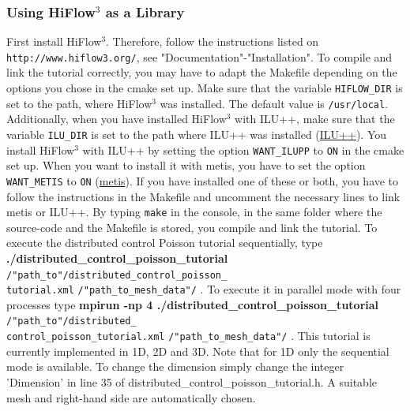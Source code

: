 \documentclass[a4paper, 11pt, twoside]{article}
\begin{document}
\subsubsection{Using HiFlow$^3$ as a Library}\label{sectionlibrary}
First install HiFlow$^3$. Therefore, follow the instructions listed on \verb'http://www.hiflow3.org/', see "Documentation"-"Installation".
To compile and link the tutorial correctly, you may have to adapt the Makefile depending on the options you chose in the cmake set up. Make sure that the variable \verb'HIFLOW_DIR' is set to the path, where HiFlow$^3$ was installed. The default value is \verb'/usr/local'. Additionally, when you have installed HiFlow$^3$ with ILU++, make sure that the variable \verb'ILU_DIR' is set to the path where ILU++ was installed (\href{http://iamlasun8.mathematik.uni-karlsruhe.de/~ae04/iluplusplus_introduction.html}{ILU++}). You install HiFlow$^3$ with ILU++ by setting the option \verb'WANT_ILUPP' to \verb'ON' in the cmake set up. When you want to install it with metis, you have to set the option \verb'WANT_METIS' to \verb'ON' (\href{http://www.cs.umn.edu/~metis}{metis}). If you have installed one of these or both, you have to follow the instructions in the Makefile and uncomment the necessary lines to link metis or ILU++. By typing \verb'make' in the console, in the same folder where the source-code and the Makefile is stored, you compile and link the tutorial. 
To execute the distributed control Poisson tutorial sequentially, type \textbf{./distributed\_control\_poisson\_tutorial} \verb'/"path_to"/distributed_control_poisson_'\\ \verb'tutorial.xml' \verb'/"path_to_mesh_data"/' . To execute it in parallel mode  with four processes type \textbf{mpirun -np 4 ./distributed\_control\_poisson\_tutorial} \verb'/"path_to"/distributed_'\\ \verb'control_poisson_tutorial.xml' \verb'/"path_to_mesh_data"/' . 
 This tutorial is currently implemented in 1D, 2D and 3D. Note that for 1D only the sequential mode is available. To change the dimension simply change the integer 'Dimension' in line 35 of distributed\_control\_poisson\_tutorial.h. A suitable mesh and right-hand side are automatically chosen.
\end{document}
